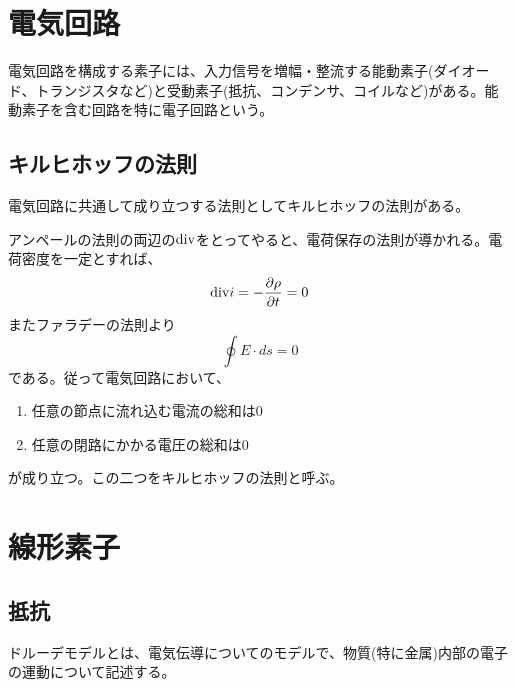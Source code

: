 
\section{電気回路}
    電気回路を構成する素子には、入力信号を増幅・整流する能動素子(ダイオード、トランジスタなど)と受動素子(抵抗、コンデンサ、コイルなど)がある。能動素子を含む回路を特に電子回路という。
    \subsection{キルヒホッフの法則}
        電気回路に共通して成り立つする法則としてキルヒホッフの法則がある。

        アンペールの法則の両辺の$\dive$をとってやると、電荷保存の法則が導かれる。電荷密度を一定とすれば、
            \[\dive i = -\pd[\rho]{t} = 0\]
        またファラデーの法則より
            \[\oint E\cdot ds = 0\]
        である。従って電気回路において、
        \begin{enumerate}
            \item 任意の節点に流れ込む電流の総和は0
            \item 任意の閉路にかかる電圧の総和は0
        \end{enumerate}
        が成り立つ。この二つをキルヒホッフの法則と呼ぶ。

\section{線形素子}
    \subsection{抵抗}
        ドルーデモデルとは、電気伝導についてのモデルで、物質(特に金属)内部の電子の運動について記述する。

